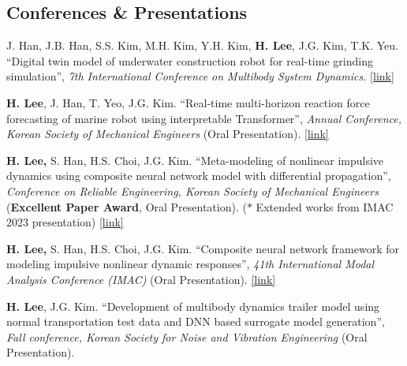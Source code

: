 \documentclass[a4paper,10pt]{extarticle}
\begin{document}
\subsection*{Conferences \& Presentations}
\begin{etaremune}[leftmargin=.5cm, itemsep=0.02cm]
	\item J. Han, J.B. Han, S.S. Kim, M.H. Kim, Y.H. Kim, \textbf{H. Lee}, J.G. Kim, T.K. Yeu. “Digital twin model of underwater construction robot for real-time grinding simulation”, \textit{7th International Conference on Multibody System Dynamics.} \href{https://easychair.org/publications/preprint/WkF3}{[link]}
	\item \textbf{H. Lee}, J. Han, T. Yeo, J.G. Kim. “Real-time multi-horizon reaction force forecasting of marine robot using interpretable Transformer”, \textit{Annual Conference, Korean Society of Mechanical Engineers} (Oral Presentation). \href{https://www.dbpia.co.kr/Journal/articleDetail?nodeId=NODE11709087}{[link]}
	\item \textbf{H. Lee,} S. Han, H.S. Choi, J.G. Kim. “Meta-modeling of nonlinear impulsive dynamics using composite neural network model with differential propagation”, \textit{Conference on Reliable Engineering, Korean Society of Mechanical Engineers} (\textbf{Excellent Paper Award}, Oral Presentation). {\small($*$ Extended works from IMAC 2023 presentation)} \href{https://www.dbpia.co.kr/journal/articleDetail?nodeId=NODE11511050}{[link]}
	\item \textbf{H. Lee,} S. Han, H.S. Choi, J.G. Kim. “Composite neural network framework for modeling impulsive nonlinear dynamic responses”, \textit{41th International Modal Analysis Conference (IMAC)} (Oral Presentation). \href{https://link.springer.com/chapter/10.1007/978-3-031-34946-1_21}{[link]}
	\item \textbf{H. Lee}, J.G. Kim. “Development of multibody dynamics trailer model using normal transportation test data and DNN based surrogate model generation”, \textit{Fall conference, Korean Society for Noise and Vibration Engineering} (Oral Presentation).
\end{etaremune}
\end{document}
